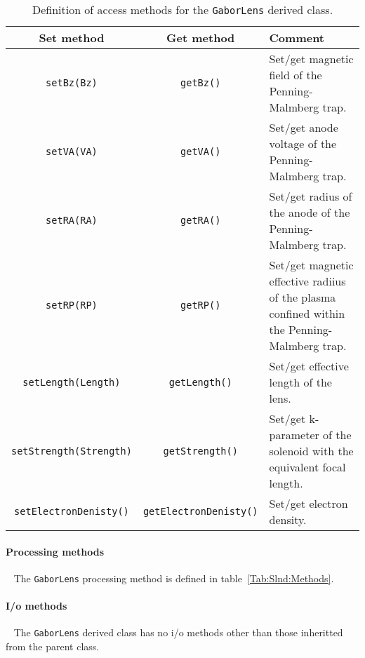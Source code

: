 \begin{table}[h]
  \caption{
    Definition of access methods for the \texttt{GaborLens} derived
    class. 
  }
  \label{Tab:GbrLns:Methods}
  \begin{center}
    \begin{tabular}{|c|c|p{7cm}|}
      \hline
      \textbf{Set method} & \textbf{Get method}  & \textbf{Comment}                                                 \\
      \hline
      \texttt{setBz(Bz)}         & \texttt{getBz()}     & Set/get magnetic field of the Penning-Malmberg trap.      \\
      \texttt{setVA(VA)}         & \texttt{getVA()}     & Set/get anode voltage of the Penning-Malmberg trap.       \\
      \texttt{setRA(RA)}         & \texttt{getRA()}     & Set/get radius of the anode of the Penning-Malmberg trap. \\
      \texttt{setRP(RP)}         & \texttt{getRP()}     & Set/get magnetic effective radiius of the plasma confined 
                                                          within the Penning-Malmberg trap.                         \\
      \texttt{setLength(Length)} & \texttt{getLength()} & Set/get effective length of the lens.                     \\

      \texttt{setStrength(Strength)} & \texttt{getStrength()} & Set/get k-parameter of the solenoid with the
                                                                equivalent focal length.                            \\
      \texttt{setElectronDenisty()} & \texttt{getElectronDenisty()} & Set/get electron density.                     \\
      \hline
    \end{tabular}
  \end{center}
\end{table}

\paragraph{Processing methods} ~\newline
\noindent
The \texttt{GaborLens} processing method is defined in
table~\ref{Tab:Slnd:Methods}.

\paragraph{I/o methods} ~\newline
\noindent
The \texttt{GaborLens} derived class has no i/o methods other
than those inheritted from the parent class.

